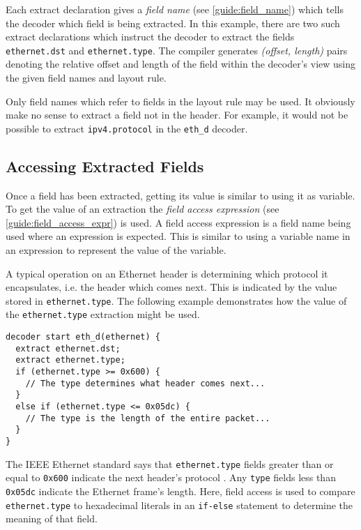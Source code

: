 Each extract declaration gives a \emph{field name} (see \ref{guide:field_name}) 
which tells the decoder which field is being extracted. 
In this example, there are
two such extract declarations which instruct the decoder to extract
the fields \texttt{ethernet.dst} and \texttt{ethernet.type}.
The compiler generates \textit{(offset, length)} pairs 
denoting the relative offset and length of the field within the decoder's view using the given field names and layout rule. 

Only field names which refer to fields in the layout rule may be used. It obviously make no sense to extract a field not in the header. 
For example, it would not be possible to extract \texttt{ipv4.protocol} in the \texttt{eth\_d} decoder. 

\subsection{Accessing Extracted Fields} \label{tut:decoder_access}

Once a field has been extracted, getting its value is similar to using
it as variable.
To get the value of an extraction
the \textit{field access expression} (see \ref{guide:field_access_expr}) is used.
A field access expression is a field name being used where
an expression is expected. This is similar to using a variable name
in an expression to represent the value of the variable.

A typical operation on an Ethernet header is determining which protocol
it encapsulates, i.e. the header which comes next. This is indicated
by the value stored in \texttt{ethernet.type}.
The following example demonstrates how the value of the \texttt{ethernet.type} 
extraction might be used.

\begin{codepage}
\begin{lstlisting}
decoder start eth_d(ethernet) {
  extract ethernet.dst;
  extract ethernet.type;
  if (ethernet.type >= 0x600) {
    // The type determines what header comes next...
  }
  else if (ethernet.type <= 0x05dc) {
    // The type is the length of the entire packet...
  }
}
\end{lstlisting}
\end{codepage}


The IEEE Ethernet standard says that \texttt{ethernet.type} fields greater than 
or equal to \texttt{0x600} indicate the next header's protocol \cite{eth_std}. 
Any \texttt{type} fields less than \texttt{0x05dc} indicate the Ethernet frame's 
length. 
Here, field access is used to compare \texttt{ethernet.type} to 
hexadecimal literals in an \texttt{if-else} statement to determine the meaning of 
that field.

